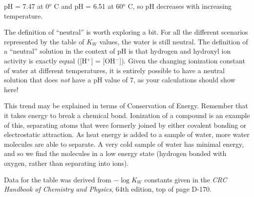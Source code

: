 





pH = 7.47 at 0$^{o}$ C and pH = 6.51 at 60$^{o}$ C, so pH decreases with increasing temperature.

\vskip 10pt

The definition of ``neutral'' is worth exploring a bit.  For all the different scenarios represented by the table of $K_W$ values, the water is still neutral.  The definition of a ``neutral'' solution in the context of pH is that hydrogen and hydroxyl ion activity is exactly equal ([H$^{+}$] = [OH$^{-}$]).  Given the changing ionization constant of water at different temperatures, it is entirely possible to have a neutral solution that does {\it not} have a pH value of 7, as your calculations should show here!

\vskip 10pt

This trend may be explained in terms of Conservation of Energy.  Remember that it takes energy to break a chemical bond.  Ionization of a compound is an example of this, separating atoms that were formerly joined by either covalent bonding or electrostatic attraction.  As heat energy is added to a sample of water, more water molecules are able to separate.  A very cold sample of water has minimal energy, and so we find the molecules in a low energy state (hydrogen bonded with oxygen, rather than separating into ions).









Data for the table was derived from $- \log K_W$ constants given in the {\it CRC Handbook of Chemistry and Physics}, 64th edition, top of page D-170.




